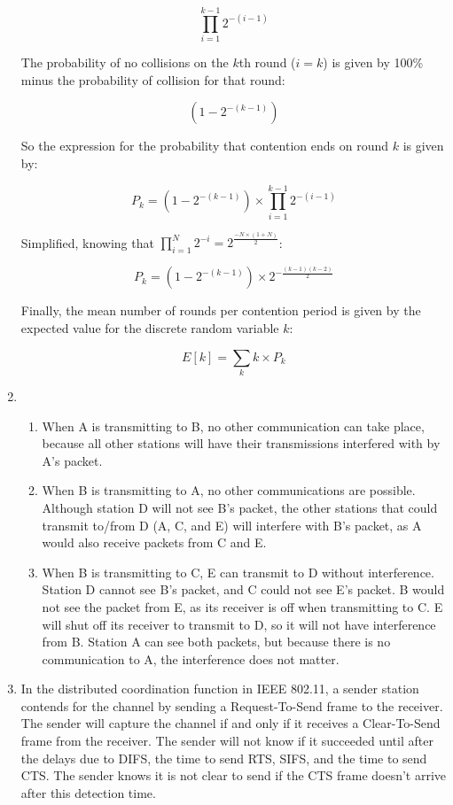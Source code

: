 \documentclass{article}
\begin{document}
\begin{enumerate}
$$ \prod_{i=1}^{k-1}2^{-(i-1)} $$

The probability of no collisions on the $ k $th round ($ i = k $) is given by 100\% minus the probability of collision for that round:

$$ (1-2^{-(k-1)}) $$

So the expression for the probability that contention ends on round $ k $ is given by:

$$ P_k = (1-2^{-(k-1)}) \times \prod_{i=1}^{k-1}2^{-(i-1)} $$

Simplified, knowing that $ \prod_{i=1}^{N}2^{-i} = 2^{\frac{-N \times (1 + N)}{2}}$:

$$ P_k = (1-2^{-(k-1)}) \times 2^{-\frac{(k-1)(k-2)}{2}} $$

Finally, the mean number of rounds per contention period is given by the expected value for the discrete random variable $ k $:

$$ E[k] = \sum_{k}k \times P_k $$

\item
\begin{enumerate}

\item When A is transmitting to B, no other communication can take place, because all other stations will have their transmissions interfered with by A's packet.

\item When B is transmitting to A, no other communications are possible. Although station D will not see B's packet, the other stations that could transmit to/from D (A, C, and E) will interfere with B's packet, as A would also receive packets from C and E.

\item When B is transmitting to C, E can transmit to D without interference. Station D cannot see B's packet, and C could not see E's packet. B would not see the packet from E, as its receiver is off when transmitting to C. E will shut off its receiver to transmit to D, so it will not have interference from B. Station A can see both packets, but because there is no communication to A, the interference does not matter.

\end{enumerate}

\item In the distributed coordination function in IEEE 802.11, a sender station contends for the channel by sending a Request-To-Send frame to the receiver. The sender will capture the channel if and only if it receives a Clear-To-Send frame from the receiver. The sender will not know if it succeeded until after the delays due to DIFS, the time to send RTS, SIFS, and the time to send CTS. The sender knows it is not clear to send if the CTS frame doesn't arrive after this detection time.


\end{enumerate}
\end{document}
